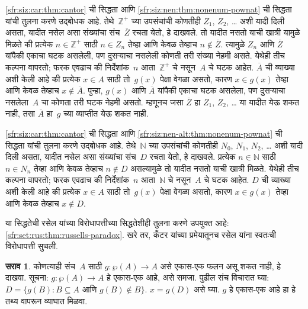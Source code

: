 \documentclass[11pt,a4paper,openany]{book}
\theoremstyle{definition}
\newtheorem{prob}{सराव}[chapter]
\newenvironment{explain}{}{}
\newcommand{\Setabs}[2]{\{#1:#2\}}
\newcommand{\Pow}[1]{\wp(#1)}
\newcommand{\Nat}{\mathbb{N}}
\newcommand{\PosInt}{\mathbb{Z}^{+}}
\begin{document}
\begin{explain}

  \ref{sfr:siz:car:thm:cantor} ची सिद्धता आणि
  \ref{sfr:siz:nen:thm:nonenum-pownat} ची सिद्धता यांची तुलना करणे उद्बोधक
  आहे. तेथे~$\PosInt$ च्या उपसंचांची कोणतीही $Z_1$, $Z_2$, \dots{}
  अशी यादी दिली असता, यादीत नसेल असा संख्यांचा संच~$\overline{Z}$
  रचता येतो, हे दाखवले. तो यादीत नसतो याची खात्री यामुळे मिळते की
  प्रत्येक $n \in
  \PosInt$ साठी $n \in Z_n$ तेव्हा आणि केवळ तेव्हाच
  $n \notin \overline{Z}$. त्यामुळे $Z_n$ आणि $\overline{Z}$ यांपैकी
  एकाचा घटक असलेली, पण दुसऱ्याचा नसलेली कोणती तरी संख्या
  नेहमी असते. येथेही तीच कल्पना वापरतो; फरक एवढाच की निर्देशांक~$n$
  आता~$\PosInt$ चे नसून~$A$ चे घटक आहेत. $\overline{A}$ ची
  व्याख्या अशी केली आहे की प्रत्येक $x \in A$ साठी तो~$g(x)$ पेक्षा
  वेगळा असतो, कारण $x \in g(x)$ तेव्हा आणि केवळ तेव्हाच
  $x \notin \overline{A}$. पुन्हा, $g(x)$ आणि $\overline{A}$ यांपैकी
  एकाचा घटक असलेला, पण दुसऱ्याचा नसलेला~$A$ चा कोणता तरी
  घटक नेहमी असतो. म्हणूनच जसा $\overline{Z}$ हा $Z_1$,
  $Z_2$, \dots{} या यादीत येऊ शकत नाही, तसा $\overline{A}$ हा~$g$ च्या
  व्याप्तीत येऊ शकत नाही.


  \ref{sfr:siz:car:thm:cantor} ची सिद्धता आणि
  \ref{sfr:siz:nen-alt:thm:nonenum-pownat} ची सिद्धता यांची तुलना करणे
  उद्बोधक आहे. तेथे~$\Nat$ च्या उपसंचांची कोणतीही $N_0$, $N_1$,
  $N_2$, \dots{} अशी यादी दिली असता, यादीत नसेल असा संख्यांचा संच~$D$
  रचता येतो, हे दाखवले. प्रत्येक $n \in \Nat$ साठी $n \in N_n$ तेव्हा
  आणि केवळ तेव्हाच $n \notin
  D$ असल्यामुळे तो यादीत नसतो याची खात्री मिळते. येथेही तीच कल्पना
  वापरतो; फरक एवढाच की निर्देशांक~$n$ आता~$\Nat$ चे नसून~$A$ चे
  घटक आहेत. $D$ ची व्याख्या अशी केली आहे की प्रत्येक $x
  \in A$ साठी तो~$g(x)$ पेक्षा वेगळा असतो, कारण $x \in g(x)$ तेव्हा
  आणि केवळ तेव्हाच $x \notin D$.

या सिद्धतेची रसेल यांच्या विरोधापत्तीच्या सिद्धतेशीही तुलना करणे उपयुक्त
आहे: \ref{sfr:set:rus:thm:russells-paradox}. खरे तर, कँटर यांच्या
प्रमेयातूनच रसेल यांना स्वतःची विरोधापत्ती सुचली.
\end{explain}

\begin{prob}
  कोणत्याही संच~$A$ साठी $g\colon \Pow{A} \to
  A$ असे एकास-एक फलन असू शकत नाही, हे दाखवा. सूचना: $g\colon
  \Pow{A} \to A$ हे एकास-एक आहे, असे समजा. पुढील संच विचारात घ्या:
  $D = \Setabs{g(B)}{B \subseteq A \text{ आणि
  } g(B) \notin B}$. $x = g(D)$ असे घ्या. $g$ हे एकास-एक आहे हा
  हे तथ्य वापरून व्याघात मिळवा.
\end{prob}
\end{document}
